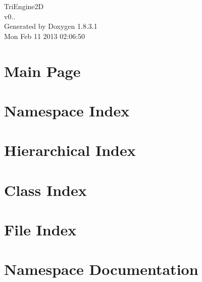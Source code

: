 \documentclass{book}
\begin{document}
\hypersetup{pageanchor=false,citecolor=blue}
\begin{titlepage}
\vspace*{7cm}
\begin{center}
{\Large Tri\-Engine2\-D \\[1ex]\large v0.. }\\
\vspace*{1cm}
{\large Generated by Doxygen 1.8.3.1}\\
\vspace*{0.5cm}
{\small Mon Feb 11 2013 02:06:50}\\
\end{center}
\end{titlepage}
\clearemptydoublepage
{}
\tableofcontents
\clearemptydoublepage
{}
\hypersetup{pageanchor=true,citecolor=blue}
\chapter{Main Page}
\label{index}\hypertarget{index}{}
\chapter{Namespace Index}

\chapter{Hierarchical Index}

\chapter{Class Index}

\chapter{File Index}

\chapter{Namespace Documentation}








\end{document}
